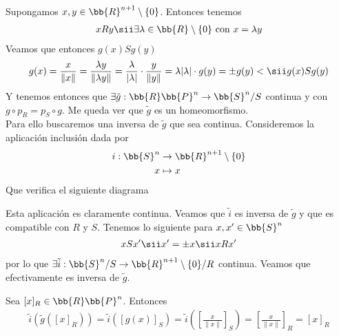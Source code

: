 \begin{ejemplo}
\begin{itemize}
        Supongamos $x,y\in \bb{R}^{n+1}\setminus \{0\}$. Entonces tenemos
        \begin{align*}
            xRy \sii \exists \lambda \in \bb{R}\setminus \{0\} \text{ con } x=\lambda y
        \end{align*}
        Veamos que entonces $g(x)Sg(y)$
        \begin{align*}
            g(x)=\frac{x}{\|x\|} = \frac{\lambda y}{\|\lambda y\|} = \frac{\lambda}{|\lambda|} \cdot \frac{y}{\|y\|} = {\lambda}{|\lambda|} \cdot g(y) = \pm g(y) <\sii g(x)Sg(y)
        \end{align*}
        Y tenemos entonces que $\exists \tilde{g}:\bb{R}\bb{P}^n \to \bb{S}^n/S$ continua y con $g \circ p_R=p_S \circ g$. Me queda ver que $\tilde{g}$ es un homeomorfismo.\\
        Para ello buscaremos una inversa de $\tilde{g}$ que sea continua. Consideremos la aplicación inclusión dada por
        \begin{align*}
            i:\bb{S}^n & \to \bb{R}^{n+1}\setminus \{0\}\\
            x & \mapsto x
        \end{align*}
        Que verifica el siguiente diagrama
        \begin{figure}[H]
            \centering
        \end{figure}
        Esta aplicación es claramente continua. Veamos que $\tilde{i}$ es inversa de $\tilde{g}$ y que es compatible con $R$ y $S$. Tenemos lo siguiente para $x,x'\in \bb{S}^n$
        \begin{align*}
            xSx' \sii x'=\pm x \sii xRx'
        \end{align*}
        por lo que $\exists \tilde{i}:\bb{S}^n/S \to \bb{R}^{n+1}\setminus \{0\}/R$ continua. Veamos que efectivamente es inversa de $\tilde{g}$.

        Sea $[x]_R\in \bb{R}\bb{P}^n$. Entonces
        \begin{align*}
            \tilde{i}(\tilde{g}([x]_R)) = \tilde{i}([g(x)]_S) = \tilde{i}\left(\left[\frac{x}{\|x\|}\right]_S\right) = \left[\frac{x}{\|x\|}\right]_R = [x]_R
        \end{align*}


\end{itemize}
\end{ejemplo}
